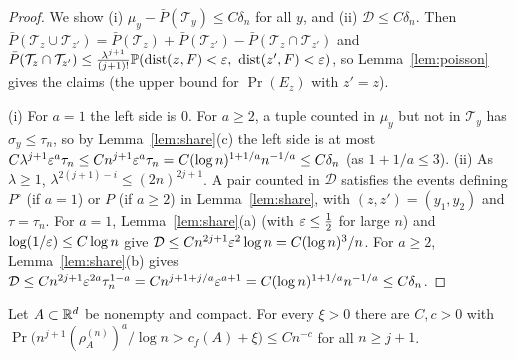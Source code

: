 \documentclass[11pt]{article}
\begin{document}
\begin{proof}
We show (i) $\mu_y-\bar P(\mathcal T_y)\le C\delta_n$ for all $y$, and (ii) $\mathcal D\le C\delta_n$. Then
$\bar P(\mathcal T_z\cup\mathcal T_{z'})=\bar P(\mathcal T_z)+\bar P(\mathcal T_{z'})-\bar P(\mathcal T_z\cap\mathcal T_{z'})$ and
$\bar P(\mathcal T_z\cap\mathcal T_{z'})\le\frac{\lambda^{j+1}}{(j+1)!}\Pr(\dist(z,F)<\eps,\ \dist(z',F)<\eps)$, so Lemma~\ref{lem:poisson} gives the
claims (the upper bound for $\Pr(E_z)$ with $z'=z$).

(i) For $a=1$ the left side is $0$. For $a\ge2$, a tuple counted in $\mu_y$ but not in $\mathcal T_y$ has $\sigma_y\le\tau_n$, so by
Lemma~\ref{lem:share}(c) the left side is at most $C\lambda^{j+1}\varepsilon^a\tau_n\le Cn^{j+1}\varepsilon^a\tau_n=C(\log n)^{1+1/a}n^{-1/a}\le C\delta_n$ (as $1+1/a\le3$).
(ii) As $\lambda\ge1$, $\lambda^{2(j+1)-i}\le(2n)^{2j+1}$. A pair counted in $\mathcal D$ satisfies the events defining $P^\circ$ (if $a=1$) or $P$ (if $a\ge2$) in
Lemma~\ref{lem:share}, with $(z,z')=(y_1,y_2)$ and $\tau=\tau_n$. For $a=1$, Lemma~\ref{lem:share}(a) (with $\varepsilon\le\frac12$ for large $n$) and $\log(1/\varepsilon)\le C\log n$
give $\mathcal D\le Cn^{2j+1}\varepsilon^2\log n=C(\log n)^3/n$. For $a\ge2$, Lemma~\ref{lem:share}(b) gives
$\mathcal D\le Cn^{2j+1}\varepsilon^{2a}\tau_n^{1-a}=Cn^{j+1+j/a}\varepsilon^{a+1}=C(\log n)^{1+1/a}n^{-1/a}\le C\delta_n$.
\end{proof}

\begin{proposition}\label{prop:upper}
Let $A\subset\mathbb{R}^d$ be nonempty and compact. For every $\xi>0$ there are $C,c>0$ with
$\Pr\bigl(n^{j+1}(\rho_A^{(n)})^a/\log n>c_f(A)+\xi\bigr)\le Cn^{-c}$ for all $n\ge j+1$.
\end{proposition}
\end{document}
